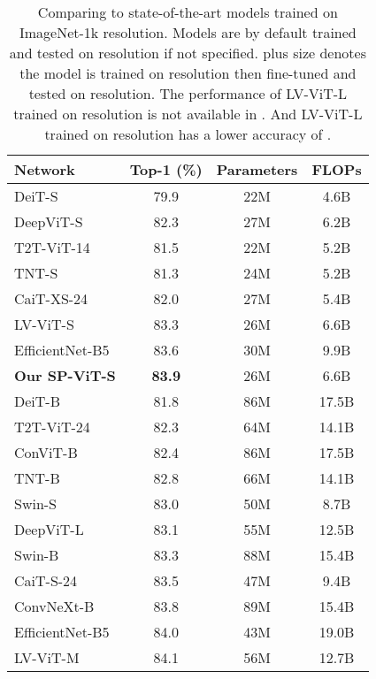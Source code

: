 \documentclass[authorversion, sigconf, acmthm=false, nonacm=true]{acmart}
\begin{document}
 \begin{table}[h]
         \caption{Comparing to state-of-the-art models trained on ImageNet-1k  resolution.  
        Models are by default trained and tested on  resolution if not specified. 
         plus size denotes the model is trained on  resolution then fine-tuned and tested on  resolution. The performance of LV-ViT-L trained on  resolution is not available in \cite{jiang2021all}. And  LV-ViT-L trained on  resolution has a lower accuracy of .}
        \centering
\begin{tabular}{lccc}
           \toprule
            Network     & Top-1 (\%) &  Parameters & FLOPs \\
            \midrule
           DeiT-S \cite{touvron2021training} & 79.9 &  22M& 4.6B\\
     
            DeepViT-S \cite{zhou2021deepvit} & 82.3 & 27M & 6.2B\\
      
           T2T-ViT-14 \cite{yuan2021tokens} & 81.5 & 22M & 5.2B \\
      
           TNT-S \cite{han2021transformer} & 81.3 & 24M & 5.2B \\
           CaiT-XS-24 \cite{touvron2021going} & 82.0 & 27M & 5.4B \\
            LV-ViT-S \cite{jiang2021all} &83.3& 26M & 6.6B \\ 
            EfficientNet-B5 \cite{tan2019efficientnet} & 83.6 & 30M & 9.9B\\
             \textbf{Our SP-ViT-S} &\textbf{83.9}&  26M& 6.6B \\ 
           \midrule
         
            DeiT-B  \cite{touvron2021training} & 81.8  & 86M& 17.5B   \\
            T2T-ViT-24 \cite{yuan2021tokens} & 82.3 & 64M & 14.1B \\
        ConViT-B \cite{d'ascoli2021convit}& 82.4 & 86M & 17.5B \\
         TNT-B \cite{yuan2021tokens} & 82.8 & 66M & 14.1B \\
          
         Swin-S \cite{liu2021swin} & 83.0 & 50M & 8.7B \\
        
           DeepViT-L \cite{zhou2021deepvit} & 83.1 & 55M &12.5B \\
            
           Swin-B \cite{liu2021swin}& 83.3 & 88M& 15.4B \\
      CaiT-S-24 \cite{touvron2021going} & 83.5 & 47M & 9.4B \\
ConvNeXt-B \cite{liu2022convnet} & 83.8 & 89M &  15.4B \\
        EfficientNet-B5 \cite{tan2019efficientnet} & 84.0 & 43M & 19.0B\\
           LV-ViT-M \cite{jiang2021all}& 84.1 & 56M & 12.7B \\



\end{tabular}
\end{table}
\end{document}
